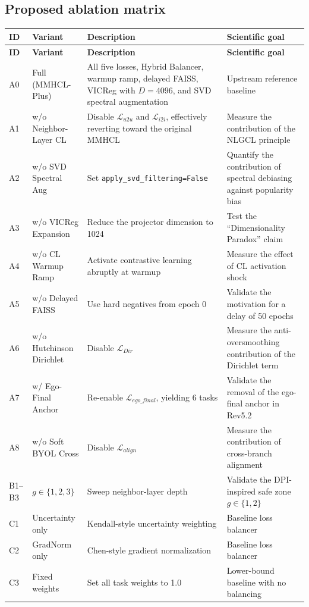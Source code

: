 \documentclass[11pt,a4paper]{article}
\begin{document}
\subsection{Proposed ablation matrix}
\begin{longtable}{|>{\raggedright\arraybackslash}p{1.3cm}|>{\raggedright\arraybackslash}p{3.6cm}|>{\raggedright\arraybackslash}p{5.0cm}|>{\raggedright\arraybackslash}p{4.1cm}|}
\hline
\textbf{ID} & \textbf{Variant} & \textbf{Description} & \textbf{Scientific goal}\\
\hline
\endfirsthead
\hline
\textbf{ID} & \textbf{Variant} & \textbf{Description} & \textbf{Scientific goal}\\
\hline
\endhead
A0 & Full (MMHCL-Plus) & All five losses, Hybrid Balancer, warmup ramp, delayed FAISS, VICReg with \(D=4096\), and SVD spectral augmentation & Upstream reference baseline\\
\hline
A1 & w/o Neighbor-Layer CL & Disable \(\mathcal{L}_{u2u}\) and \(\mathcal{L}_{i2i}\), effectively reverting toward the original MMHCL & Measure the contribution of the NLGCL principle\\
\hline
A2 & w/o SVD Spectral Aug & Set \texttt{apply\_svd\_filtering=False} & Quantify the contribution of spectral debiasing against popularity bias\\
\hline
A3 & w/o VICReg Expansion & Reduce the projector dimension to 1024 & Test the ``Dimensionality Paradox'' claim\\
\hline
A4 & w/o CL Warmup Ramp & Activate contrastive learning abruptly at warmup & Measure the effect of CL activation shock\\
\hline
A5 & w/o Delayed FAISS & Use hard negatives from epoch 0 & Validate the motivation for a delay of 50 epochs\\
\hline
A6 & w/o Hutchinson Dirichlet & Disable \(\mathcal{L}_{Dir}\) & Measure the anti-oversmoothing contribution of the Dirichlet term\\
\hline
A7 & w/ Ego-Final Anchor & Re-enable \(\mathcal{L}_{ego\_final}\), yielding 6 tasks & Validate the removal of the ego-final anchor in Rev5.2\\
\hline
A8 & w/o Soft BYOL Cross & Disable \(\mathcal{L}_{align}\) & Measure the contribution of cross-branch alignment\\
\hline
B1--B3 & \(g \in \{1,2,3\}\) & Sweep neighbor-layer depth & Validate the DPI-inspired safe zone \(g \in \{1,2\}\)\\
\hline
C1 & Uncertainty only & Kendall-style uncertainty weighting & Baseline loss balancer\\
\hline
C2 & GradNorm only & Chen-style gradient normalization & Baseline loss balancer\\
\hline
C3 & Fixed weights & Set all task weights to 1.0 & Lower-bound baseline with no balancing\\
\hline
\end{longtable}
\end{document}
